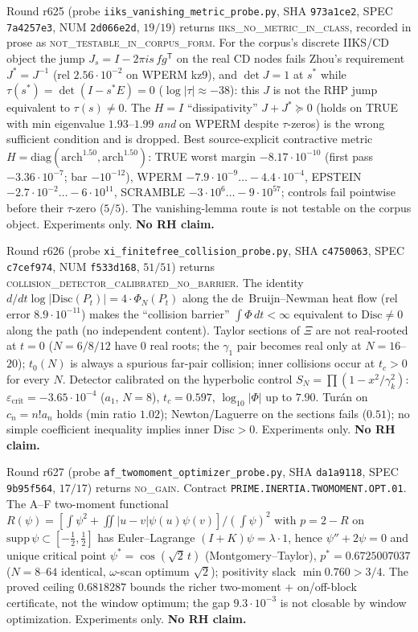 \documentclass[11pt]{article}
\theoremstyle{definition}
\theoremstyle{remark}
\begin{document}
\noindent Round r625 (probe \texttt{iiks\_vanishing\_metric\_probe.py},
SHA \texttt{973a1ce2}, SPEC \texttt{7a4257e3}, NUM
\texttt{2d066e2d}, $19/19$) returns
\textsc{iiks\_no\_metric\_in\_class}, recorded in prose as
\textsc{not\_testable\_in\_corpus\_form}.  For the corpus's
discrete IIKS/CD object the jump $J_s=I-2\pi i s\,fg^{\mathsf T}$
on the real CD nodes fails Zhou's requirement $J^*=J^{-1}$
(rel $2.56\cdot10^{-2}$ on WPERM kz9), and $\det J=1$ at $s^*$
while $\tau(s^*)=\det(I-s^*E)=0$ ($\log\lvert\tau\rvert\approx-38$):
this $J$ is not the RHP jump equivalent to $\tau(s)\ne0$.  The
$H=I$ ``dissipativity'' $J+J^*\succeq0$ (holds on TRUE with min
eigenvalue $1.93$--$1.99$ \emph{and} on WPERM despite $\tau$-zeros)
is the wrong sufficient condition and is dropped.  Best
source-explicit contractive metric
$H=\mathrm{diag}(\mathrm{arch}^{1.50},\mathrm{arch}^{1.50})$:
TRUE worst margin $-8.17\cdot10^{-10}$ (first pass
$-3.36\cdot10^{-7}$; bar $-10^{-12}$), WPERM
$-7.9\cdot10^{-9}\ldots-4.4\cdot10^{-4}$, EPSTEIN
$-2.7\cdot10^{-2}\ldots-6\cdot10^{11}$, SCRAMBLE
$-3\cdot10^{6}\ldots-9\cdot10^{57}$; controls fail pointwise
before their $\tau$-zero ($5/5$).  The vanishing-lemma route is
not testable on the corpus object.  Experiments only.
\textbf{No RH claim.}

\noindent Round r626 (probe \texttt{xi\_finitefree\_collision\_probe.py},
SHA \texttt{c4750063}, SPEC \texttt{c7cef974}, NUM
\texttt{f533d168}, $51/51$) returns
\textsc{collision\_detector\_calibrated\_no\_barrier}.  The
identity $d/dt\log\lvert\mathrm{Disc}(P_t)\rvert=4\cdot\Phi_N(P_t)$
along the de~Bruijn--Newman heat flow (rel error
$8.9\cdot10^{-11}$) makes the ``collision barrier''
$\int\Phi\,dt<\infty$ equivalent to $\mathrm{Disc}\ne0$ along the
path (no independent content).  Taylor sections of $\Xi$ are not
real-rooted at $t=0$ ($N=6/8/12$ have $0$ real roots; the
$\gamma_1$ pair becomes real only at $N=16$--$20$); $t_0(N)$ is
always a spurious far-pair collision; inner collisions occur at
$t_c>0$ for every $N$.  Detector calibrated on the hyperbolic
control $S_N=\prod(1-x^2/\gamma_k^2)$:
$\varepsilon_{\mathrm{crit}}=-3.65\cdot10^{-4}$ ($a_1$, $N=8$),
$t_c=0.597$, $\log_{10}\lvert\Phi\rvert$ up to $7.90$.  Tur\'an
on $c_n=n!a_n$ holds (min ratio $1.02$); Newton/Laguerre on the
sections fails ($0.51$); no simple coefficient inequality
implies inner $\mathrm{Disc}>0$.  Experiments only.
\textbf{No RH claim.}

\noindent Round r627 (probe \texttt{af\_twomoment\_optimizer\_probe.py},
SHA \texttt{da1a9118}, SPEC \texttt{9b95f564}, $17/17$) returns
\textsc{no\_gain}.  Contract \texttt{PRIME.INERTIA.TWOMOMENT.OPT.01}.
The A--F two-moment functional
$R(\psi)=[\int\psi^2+\iint\lvert u-v\rvert\psi(u)\psi(v)]/(\int\psi)^2$
with $p=2-R$ on $\mathrm{supp}\,\psi\subset[-\tfrac12,\tfrac12]$
has Euler--Lagrange $(I+K)\psi=\lambda\cdot 1$, hence
$\psi''+2\psi=0$ and unique critical point
$\psi^*=\cos(\sqrt{2}\,t)$ (Montgomery--Taylor),
$p^*=0.6725007037$ ($N=8$--$64$ identical, $\omega$-scan optimum
$\sqrt{2}$); positivity slack $\min 0.760>3/4$.  The proved ceiling
$0.6818287$ bounds the richer two-moment $+$ on/off-block
certificate, not the window optimum; the gap $9.3\cdot10^{-3}$ is
not closable by window optimization.  Experiments only.
\textbf{No RH claim.}
\end{document}
